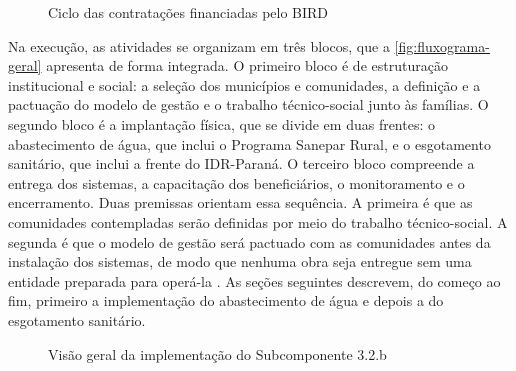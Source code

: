 \begin{figure}[htbp]
  \centering
  \caption{Ciclo das contratações financiadas pelo BIRD}
  \label{fig:ciclo-contratacao}
\end{figure}

Na execução, as atividades se organizam em três blocos, que a
\autoref{fig:fluxograma-geral} apresenta de forma integrada. O primeiro bloco
é de estruturação institucional e social: a seleção dos municípios e
comunidades, a definição e a pactuação do modelo de gestão e o trabalho
técnico-social junto às famílias. O segundo bloco é a implantação física, que
se divide em duas frentes: o abastecimento de água, que inclui o Programa
Sanepar Rural, e o esgotamento sanitário, que inclui a frente do IDR-Paraná. O
terceiro bloco compreende a entrega dos sistemas, a capacitação dos
beneficiários, o monitoramento e o encerramento. Duas premissas orientam essa
sequência. A primeira é que as comunidades contempladas serão definidas por
meio do trabalho técnico-social. A segunda é que o modelo de gestão será
pactuado com as comunidades antes da instalação dos sistemas, de modo que
nenhuma obra seja entregue sem uma entidade preparada para operá-la
\cite{mop2026}. As seções seguintes descrevem, do começo ao fim, primeiro a
implementação do abastecimento de água e depois a do esgotamento sanitário.

\begin{figure}[htbp]
  \centering
  \caption{Visão geral da implementação do Subcomponente 3.2.b}
  \label{fig:fluxograma-geral}
\end{figure}




